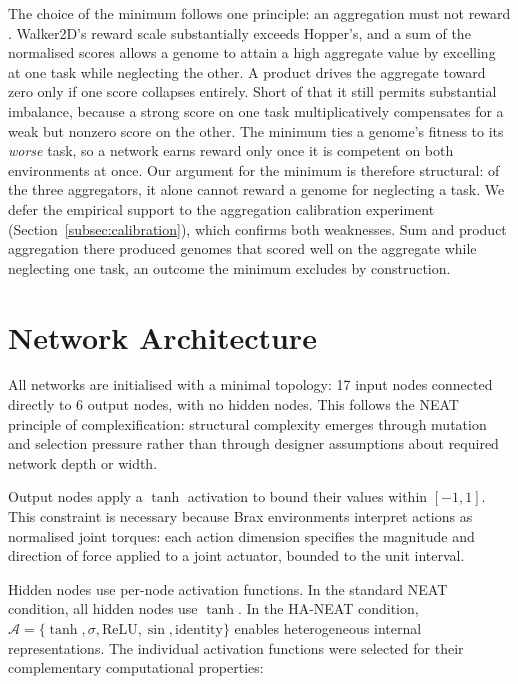 The choice of the minimum follows one principle: an aggregation must not reward .
Walker2D's reward scale substantially exceeds Hopper's, and a sum of the normalised scores allows a genome to attain a high aggregate value by excelling at one task while neglecting the other.
A product drives the aggregate toward zero only if one score collapses entirely. Short of that it still permits substantial imbalance, because a strong score on one task multiplicatively compensates for a weak but nonzero score on the other.
The minimum ties a genome's fitness to its \emph{worse} task, so a network earns reward only once it is competent on both environments at once.
Our argument for the minimum is therefore structural: of the three aggregators, it alone cannot reward a genome for neglecting a task.
We defer the empirical support to the aggregation calibration experiment (Section~\ref{subsec:calibration}), which confirms both weaknesses. Sum and product aggregation there produced genomes that scored well on the aggregate while neglecting one task, an outcome the minimum excludes by construction.

\section{Network Architecture}
\label{subsec:network-architecture}

All networks are initialised with a minimal topology: 17 input nodes connected directly to 6 output nodes, with no hidden nodes.
This follows the NEAT principle of complexification: structural complexity emerges through mutation and selection pressure rather than through designer assumptions about required network depth or width.

Output nodes apply a $\tanh$ activation to bound their values within $[-1, 1]$.
This constraint is necessary because Brax environments interpret actions as normalised joint torques: each action dimension specifies the magnitude and direction of force applied to a joint actuator, bounded to the unit interval.

Hidden nodes use per-node activation functions.
In the standard NEAT condition, all hidden nodes use $\tanh$.
In the HA-NEAT condition,  $\mathcal{A} = \{\tanh, \sigma, \text{ReLU}, \sin, \text{identity}\}$ enables heterogeneous internal representations.
The individual activation functions were selected for their complementary computational properties:

